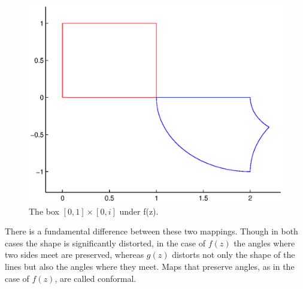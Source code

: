 \begin{figure}
\begin{center}
\includegraphics[scale=0.5]{map2}
\caption{The box $[0,1]\times[0,i]$ under f(z).}
\end{center}
\end{figure}

There is a fundamental difference between these two mappings.  Though in both cases the shape is significantly distorted, in the case of $f(z)$ the angles where two sides meet are preserved, whereas $g(z)$ distorts not only the shape of the lines but also the angles where they meet.  Maps that preserve angles, as in the case of $f(z)$, are called conformal.

